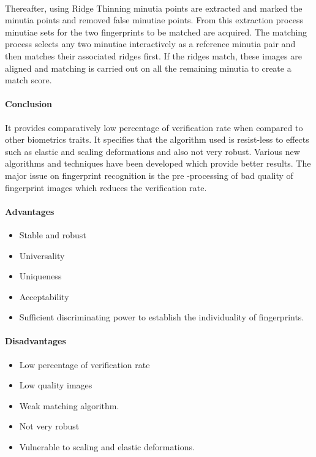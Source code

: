 \paragraph{}
Thereafter, using Ridge Thinning minutia points are extracted and marked the minutia points and removed false minutiae points. From this extraction process minutiae sets for the two fingerprints to be matched are acquired. The matching process selects any two minutiae interactively as a reference minutia pair and then matches their associated ridges first. If the ridges match, these images are aligned and matching is carried out on all the remaining minutia to create a match score. 
\paragraph{\textbf{Conclusion}}
It provides comparatively low percentage of verification rate when compared to other biometrics traits. It specifies that the algorithm used is resist-less to effects such as elastic and scaling deformations and also not very robust. Various new algorithms and techniques have been developed which provide better results. The major issue on fingerprint recognition is the pre -processing of bad quality of fingerprint images which reduces the verification rate.
\paragraph{Advantages}
\begin{itemize}
\item Stable and robust 
\item Universality
\item Uniqueness
\item Acceptability
\item Sufficient discriminating power to establish the individuality of fingerprints.
\end{itemize}
\paragraph{Disadvantages}
\begin{itemize}
\item Low percentage of verification rate
\item Low quality images 
\item Weak matching algorithm.
\item Not very robust 
\item Vulnerable to scaling and elastic deformations.
\end{itemize}

